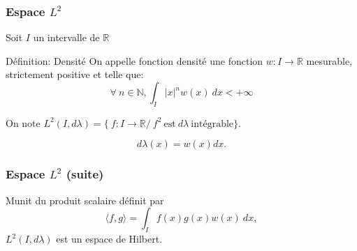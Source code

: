 \documentclass[xcolor=dvipsnames,10pt,mathserif]{beamer}
\theoremstyle{plain}
\newcommand{\la}{\langle}
\newcommand{\ra}{\rangle}
\newcommand{\R}{\mathbb{R}}
\newcommand{\N}{\mathbb{N}}
\begin{document}
\begin{frame} \frametitle{Espace $L^2$ \hfill \insertpagenumber}

Soit $I$ un intervalle de $\R$
\begin{block}{Définition: Densité}
On appelle fonction densité une fonction $w:I \longrightarrow \R$ mesurable, strictement positive et telle que:
\begin{equation}
\forall \ n \in \N, \int_I{|x|^n w(x)\ dx} < +\infty
\end{equation} 
\end{block}

\pause

\begin{block}{}
On note $L^2(I,d \lambda)=\{ \ f:I \longrightarrow \R / \ f^2 \  \text{est}\ d \lambda \ \text{intégrable} \}$.
\end{block}
\begin{equation}
d \lambda (x) = w(x)dx.
\end{equation}

\end{frame}
 
\begin{frame} \frametitle{Espace $L^2$ (suite) \hfill \insertpagenumber}

\begin{block}{}
Munit du produit scalaire définit par
\begin{equation}
\la f,g \ra = \int_I{f(x)g(x) w(x) \ dx}, 
\end{equation}
$ L^2(I,d\lambda)$ est un espace de Hilbert.
\end{block}

\end{frame}
 
\end{document}
